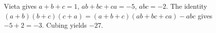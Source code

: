 Vieta gives $a+b+c=1$, $ab+bc+ca=-5$, $abc=-2$. The identity $(a+b)(b+c)(c+a)=(a+b+c)(ab+bc+ca)-abc$ gives $-5+2=-3$. Cubing yields $\boxed{-27}$.
